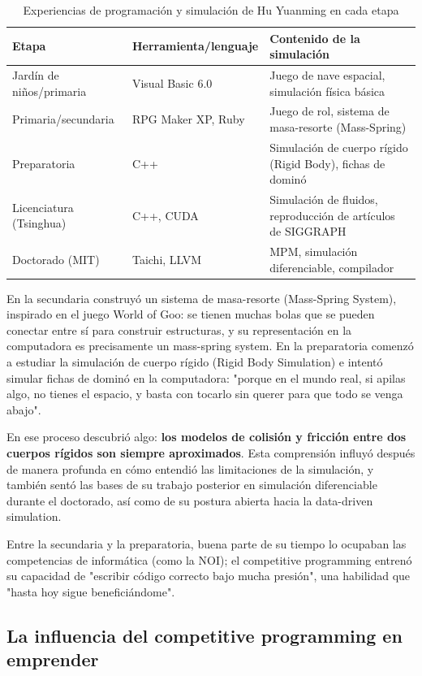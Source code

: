 \documentclass[a4paper]{article}
\begin{document}
\begin{table}[H]
\centering
\caption{Experiencias de programación y simulación de Hu Yuanming en cada etapa}
\begin{tabular}{lll}
\toprule
\textbf{Etapa} & \textbf{Herramienta/lenguaje} & \textbf{Contenido de la simulación} \\
\midrule
Jardín de niños/primaria & Visual Basic 6.0 & Juego de nave espacial, simulación física básica \\
Primaria/secundaria & RPG Maker XP, Ruby & Juego de rol, sistema de masa-resorte (Mass-Spring) \\
Preparatoria & C++ & Simulación de cuerpo rígido (Rigid Body), fichas de dominó \\
Licenciatura (Tsinghua) & C++, CUDA & Simulación de fluidos, reproducción de artículos de SIGGRAPH \\
Doctorado (MIT) & Taichi, LLVM & MPM, simulación diferenciable, compilador \\
\bottomrule
\end{tabular}
\end{table}

En la secundaria construyó un sistema de masa-resorte (Mass-Spring System), inspirado en el juego World of Goo: se tienen muchas bolas que se pueden conectar entre sí para construir estructuras, y su representación en la computadora es precisamente un mass-spring system. En la preparatoria comenzó a estudiar la simulación de cuerpo rígido (Rigid Body Simulation) e intentó simular fichas de dominó en la computadora: "porque en el mundo real, si apilas algo, no tienes el espacio, y basta con tocarlo sin querer para que todo se venga abajo".

En ese proceso descubrió algo: \textbf{los modelos de colisión y fricción entre dos cuerpos rígidos son siempre aproximados}. Esta comprensión influyó después de manera profunda en cómo entendió las limitaciones de la simulación, y también sentó las bases de su trabajo posterior en simulación diferenciable durante el doctorado, así como de su postura abierta hacia la data-driven simulation.

Entre la secundaria y la preparatoria, buena parte de su tiempo lo ocupaban las competencias de informática (como la NOI); el competitive programming entrenó su capacidad de "escribir código correcto bajo mucha presión", una habilidad que "hasta hoy sigue beneficiándome".

\subsection{La influencia del competitive programming en emprender}
\end{document}
